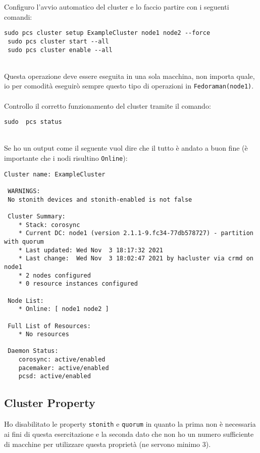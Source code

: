 Configuro l'avvio automatico del cluster e lo faccio partire con i seguenti comandi:

\begin{lstlisting}[style=cmd]
 sudo pcs cluster setup ExampleCluster node1 node2 --force
 sudo pcs cluster start --all
 sudo pcs cluster enable --all
\end{lstlisting}
\ \\
Questa operazione deve essere eseguita in una sola macchina, non importa quale, io per comodit\`{a} eseguir\`{o} sempre questo tipo di operazioni in \lstinline[style=cmd]|Fedoraman(node1)|.
\ \\
Controllo il corretto funzionamento del cluster tramite il comando:

\begin{lstlisting}[style=cmd]
 sudo  pcs status
\end{lstlisting}
\ \\
Se ho un output come il seguente vuol dire che il tutto \`{e} andato a buon fine (\`{e} importante che i nodi risultino \lstinline[style=cmd]|Online|):

\begin{lstlisting}[style=output]
 Cluster name: ExampleCluster
 
 WARNINGS:
 No stonith devices and stonith-enabled is not false
 
 Cluster Summary:
    * Stack: corosync
    * Current DC: node1 (version 2.1.1-9.fc34-77db578727) - partition with quorum
    * Last updated: Wed Nov  3 18:17:32 2021
    * Last change:  Wed Nov  3 18:02:47 2021 by hacluster via crmd on node1
    * 2 nodes configured
    * 0 resource instances configured
 
 Node List:
    * Online: [ node1 node2 ]
 
 Full List of Resources:
    * No resources
 
 Daemon Status:
    corosync: active/enabled
    pacemaker: active/enabled
    pcsd: active/enabled
\end{lstlisting}

\subsection{Cluster Property}

Ho disabilitato le property \lstinline[style=cmd]|stonith| e \lstinline[style=cmd]|quorum| in quanto la prima non \`{e} necessaria ai fini di questa esercitazione e la seconda dato che non ho un numero sufficiente di macchine per utilizzare questa propriet\`{a} (ne servono minimo 3).

